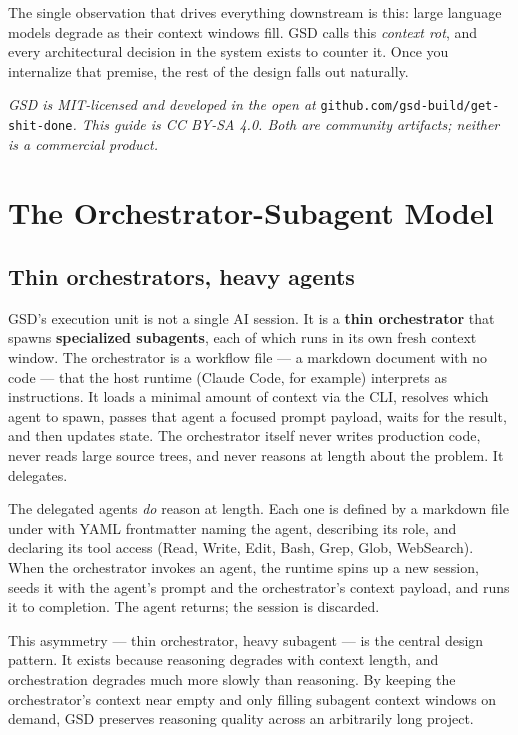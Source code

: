 \documentclass[11pt,letterpaper,openany]{book}
\begin{document}
The single observation that drives everything downstream is this: large language models degrade as their context windows fill. GSD calls this \textit{context rot}, and every architectural decision in the system exists to counter it. Once you internalize that premise, the rest of the design falls out naturally.

\bigskip
\noindent\textit{GSD is MIT-licensed and developed in the open at} \texttt{github.com/gsd-build/get-shit-done}\textit{. This guide is CC BY-SA 4.0. Both are community artifacts; neither is a commercial product.}

\clearpage

\chapter{The Orchestrator-Subagent Model}

\section{Thin orchestrators, heavy agents}

GSD's execution unit is not a single AI session. It is a \textbf{thin orchestrator} that spawns \textbf{specialized subagents}, each of which runs in its own fresh context window. The orchestrator is a workflow file — a markdown document with no code — that the host runtime (Claude Code, for example) interprets as instructions. It loads a minimal amount of context via the  CLI, resolves which agent to spawn, passes that agent a focused prompt payload, waits for the result, and then updates state. The orchestrator itself never writes production code, never reads large source trees, and never reasons at length about the problem. It delegates.

The delegated agents \emph{do} reason at length. Each one is defined by a markdown file under  with YAML frontmatter naming the agent, describing its role, and declaring its tool access (Read, Write, Edit, Bash, Grep, Glob, WebSearch). When the orchestrator invokes an agent, the runtime spins up a new session, seeds it with the agent's prompt and the orchestrator's context payload, and runs it to completion. The agent returns; the session is discarded.

This asymmetry — thin orchestrator, heavy subagent — is the central design pattern. It exists because reasoning degrades with context length, and orchestration degrades much more slowly than reasoning. By keeping the orchestrator's context near empty and only filling subagent context windows on demand, GSD preserves reasoning quality across an arbitrarily long project.
\end{document}
